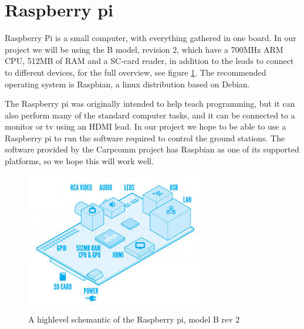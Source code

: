 \section{Raspberry pi}
Raspberry Pi is a small computer, with everything gathered in one board. In our project we will be using the B model, revision 2, which have a 700MHz ARM CPU, 512MB of RAM and a SC-card reader, in addition to the leads to connect to different devices, for  the full overview, see figure \ref{fig:raspberrypihighlevel}. The recommended operating system is Raspbian, a linux distribution based on Debian. 

The Raspberry pi was originally intended to help teach programming, but it can also perform many of the standard computer tasks, and it can be connected to a monitor or tv using an HDMI lead. In our project we hope to be able to use a Raspberry pi to run the software required to control the ground stations. The software provided by the Carpcomm project has Raspbian as one of its supported platforms, so we hope this will work well.

\begin{figure}
	\begin{center}
		\includegraphics[width=0.7\textwidth]{Figures/raspberrypi_modelb_hl.jpg}
	\end{center}
	\caption[Raspberry pi highlevel]{A highlevel schemantic of the Raspberry pi, model B rev 2}
	\label{fig:raspberrypihighlevel}
\end{figure}

